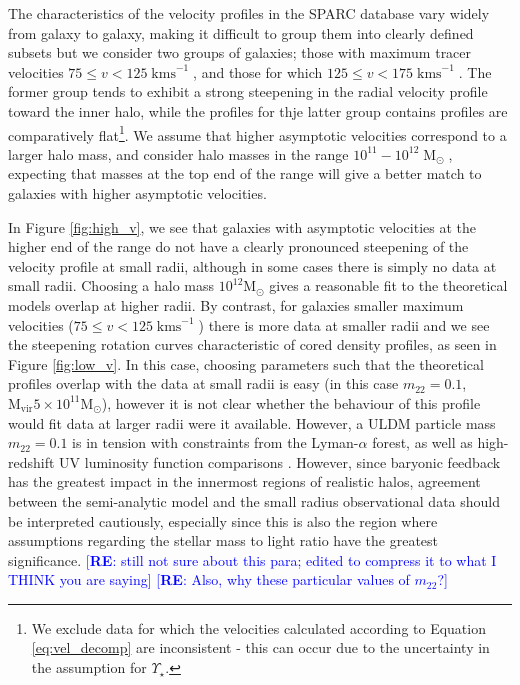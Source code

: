 \documentclass{pasa}%
\newcommand{\re}[1]{\textcolor{blue}{[{\bf RE}: #1]}}
\begin{document}
The characteristics of the velocity profiles in the SPARC database vary widely from galaxy to galaxy, making it difficult to group them into clearly defined subsets but we consider two groups of galaxies; those with maximum tracer velocities $75 \leq v < 125\operatorname{kms}^{-1}$, and those for which $125 \leq v < 175\operatorname{kms}^{-1}$. The former group tends to exhibit a strong steepening in the radial velocity profile toward the inner halo, while the  profiles for thje latter  group contains profiles  are comparatively flat\footnote{We exclude data for which the velocities calculated according to Equation \ref{eq:vel_decomp} are inconsistent - this can occur due to the uncertainty in the assumption for $\Upsilon_\star$.}. We assume that higher asymptotic velocities correspond to a larger halo mass, and consider halo masses in the range $10^{11} - 10^{12} \operatorname{M}_{\odot}$, expecting that masses at the top end of the range will give a better match to galaxies with higher asymptotic velocities. 



 In Figure \ref{fig:high_v}, we see that galaxies with asymptotic velocities at the higher end of the range do not have a clearly pronounced steepening of the velocity profile at small radii, although in some cases there is simply no data at small radii. Choosing a halo mass $10^{12} \mathrm{M}_{\odot}$ gives a reasonable fit to the theoretical models overlap at higher radii. By contrast, for galaxies smaller maximum velocities ($75 \leq v < 125\operatorname{kms}^{-1}$) there is more data at smaller radii and we see the steepening rotation curves characteristic of cored density profiles, as seen in Figure \ref{fig:low_v}. In this case, choosing parameters such that the theoretical profiles overlap with the data at small radii is easy (in this case $m_{22} = 0.1$, $\mathrm{M}_{\mathrm{vir}}5\times10^{11} \mathrm{M}_{\odot}$), however it is not clear whether the behaviour of this profile would fit data at larger radii were it available. However,  a ULDM particle mass $m_{22} = 0.1$ is in tension with constraints from the Lyman-$\alpha$ forest, as well as high-redshift UV luminosity function comparisons \cite{Amendola:2005ad, Bozek:2014uqa, Armengaud:2017nkf, Ni:2019qfa, Nebrin:2018vqt}. However, since baryonic feedback has the greatest impact in the innermost regions of realistic halos, agreement between the semi-analytic model and the small radius observational data should be interpreted cautiously, especially since this is also the region where assumptions regarding the stellar mass to light ratio have the greatest significance.  \re{still not sure about this para; edited to compress it to what I  THINK you are saying} \re{Also, why these particular values of $m_{22}$?}
\end{document}
